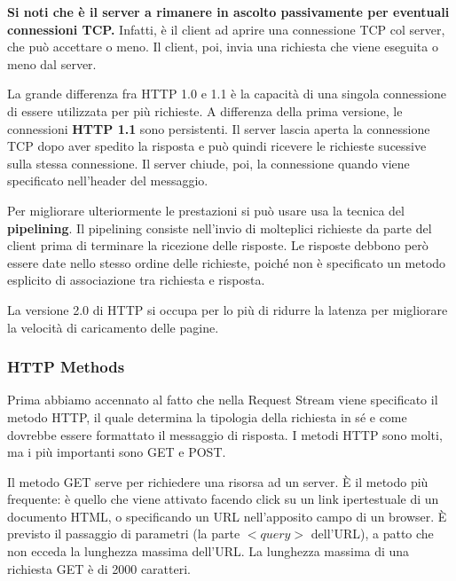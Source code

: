         \vspace{3mm}
        
        \textbf{Si noti che è il server a rimanere in ascolto passivamente per eventuali connessioni TCP.} Infatti, è il client ad aprire una connessione TCP col server, che può accettare o meno. Il client, poi, invia una richiesta che viene eseguita o meno dal server.
        
        \vspace{3mm}
        
        La grande differenza fra HTTP 1.0 e 1.1 è la capacità di una singola connessione di essere utilizzata per più richieste. A differenza della prima versione, le connessioni \textbf{HTTP 1.1} sono persistenti. Il server lascia aperta la connessione TCP dopo aver spedito la risposta e può quindi ricevere le richieste sucessive sulla stessa connessione. Il server chiude, poi, la connessione quando viene specificato nell'header del messaggio. 
        
        \vspace{3mm}
        
        Per migliorare ulteriormente le prestazioni si può usare usa la tecnica del \textbf{pipelining}. Il pipelining consiste nell’invio di molteplici richieste da parte del client prima di terminare la ricezione delle risposte. Le risposte debbono però essere date nello stesso ordine delle richieste, poiché non è specificato un metodo esplicito di associazione tra richiesta e risposta.
        
        \vspace{3mm}
        
        La versione 2.0 di HTTP si occupa per lo più di ridurre la latenza per migliorare la velocità di caricamento delle pagine.
        
        \subsubsection{HTTP Methods}
            
            Prima abbiamo accennato al fatto che nella Request Stream viene specificato il metodo HTTP, il quale determina la tipologia della richiesta in sé e come dovrebbe essere formattato il messaggio di risposta. I metodi HTTP sono molti, ma i più importanti sono GET e POST.
            
            \vspace{3mm}
            
            Il metodo GET serve per richiedere una risorsa ad un server. È il metodo più frequente: è quello che viene attivato
            facendo click su un link ipertestuale di un documento HTML, o specificando un URL nell’apposito campo di un browser. È previsto il passaggio di parametri (la parte \(<query>\) dell’URL), a patto che non ecceda la lunghezza massima dell'URL. La lunghezza massima di una richiesta GET è di 2000 caratteri.
            
